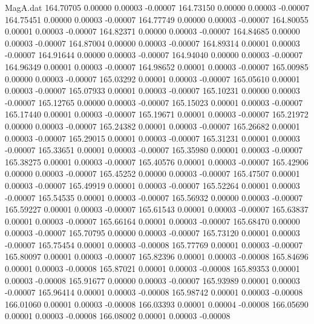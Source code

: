 \begin{filecontents}{MagA.dat}
 164.70705    0.00000    0.00003   -0.00007
 164.73150    0.00000    0.00003   -0.00007
 164.75451    0.00000    0.00003   -0.00007
 164.77749    0.00000    0.00003   -0.00007
 164.80055    0.00001    0.00003   -0.00007
 164.82371    0.00000    0.00003   -0.00007
 164.84685    0.00000    0.00003   -0.00007
 164.87004    0.00000    0.00003   -0.00007
 164.89314    0.00001    0.00003   -0.00007
 164.91644    0.00000    0.00003   -0.00007
 164.94040    0.00000    0.00003   -0.00007
 164.96349    0.00001    0.00003   -0.00007
 164.98652    0.00001    0.00003   -0.00007
 165.00985    0.00000    0.00003   -0.00007
 165.03292    0.00001    0.00003   -0.00007
 165.05610    0.00001    0.00003   -0.00007
 165.07933    0.00001    0.00003   -0.00007
 165.10231    0.00000    0.00003   -0.00007
 165.12765    0.00000    0.00003   -0.00007
 165.15023    0.00001    0.00003   -0.00007
 165.17440    0.00001    0.00003   -0.00007
 165.19671    0.00001    0.00003   -0.00007
 165.21972    0.00000    0.00003   -0.00007
 165.24382    0.00001    0.00003   -0.00007
 165.26682    0.00001    0.00003   -0.00007
 165.29015    0.00001    0.00003   -0.00007
 165.31231    0.00001    0.00003   -0.00007
 165.33651    0.00001    0.00003   -0.00007
 165.35980    0.00001    0.00003   -0.00007
 165.38275    0.00001    0.00003   -0.00007
 165.40576    0.00001    0.00003   -0.00007
 165.42906    0.00000    0.00003   -0.00007
 165.45252    0.00000    0.00003   -0.00007
 165.47507    0.00001    0.00003   -0.00007
 165.49919    0.00001    0.00003   -0.00007
 165.52264    0.00001    0.00003   -0.00007
 165.54535    0.00001    0.00003   -0.00007
 165.56932    0.00000    0.00003   -0.00007
 165.59227    0.00001    0.00003   -0.00007
 165.61543    0.00001    0.00003   -0.00007
 165.63837    0.00001    0.00003   -0.00007
 165.66164    0.00001    0.00003   -0.00007
 165.68470    0.00000    0.00003   -0.00007
 165.70795    0.00000    0.00003   -0.00007
 165.73120    0.00001    0.00003   -0.00007
 165.75454    0.00001    0.00003   -0.00008
 165.77769    0.00001    0.00003   -0.00007
 165.80097    0.00001    0.00003   -0.00007
 165.82396    0.00001    0.00003   -0.00008
 165.84696    0.00001    0.00003   -0.00008
 165.87021    0.00001    0.00003   -0.00008
 165.89353    0.00001    0.00003   -0.00008
 165.91677    0.00000    0.00003   -0.00007
 165.93989    0.00001    0.00003   -0.00007
 165.96414    0.00001    0.00003   -0.00008
 165.98742    0.00001    0.00003   -0.00008
 166.01060    0.00001    0.00003   -0.00008
 166.03393    0.00001    0.00004   -0.00008
 166.05690    0.00001    0.00003   -0.00008
 166.08002    0.00001    0.00003   -0.00008

\end{filecontents}
